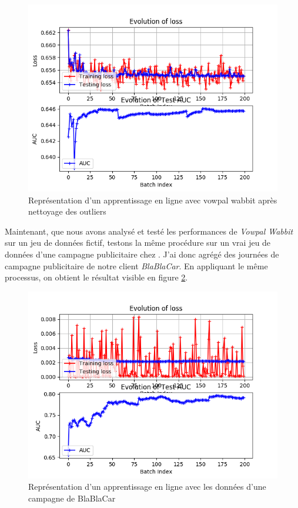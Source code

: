         \begin{figure}[h]
            \label{fig:exp_outliers_last}
            \centering
            \includegraphics[scale=0.75]{images/experiment_outliers_last.png}
            \caption{Représentation d'un apprentissage en ligne avec vowpal wabbit après nettoyage des outliers}
        \end{figure}
        \par
        Maintenant, que nous avons analysé et testé les performances de \emph{Vowpal Wabbit} sur un jeu de données \fg fictif\og, testons la même procédure sur un vrai jeu de données d'une campagne publicitaire chez \med. J'ai donc agrégé des journées de campagne publicitaire de notre client \emph{BlaBlaCar}. En appliquant le même processus, on obtient le résultat visible en figure \ref{fig:exp_blabla}. 
        \begin{figure}[h]
            \label{fig:exp_blabla}
            \centering
            \includegraphics[scale=0.75]{images/blabla_exp.png}
            \caption{Représentation d'un apprentissage en ligne avec les données d'une campagne de BlaBlaCar}
        \end{figure}
